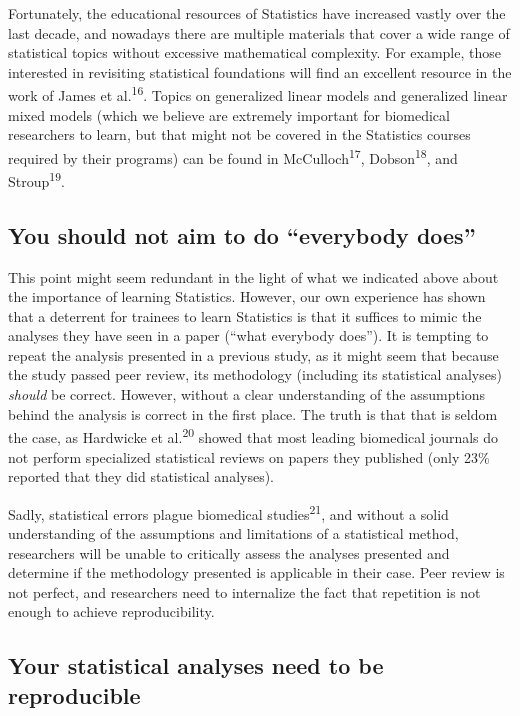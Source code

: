\documentclass[smallextended]{svjour3}       %
\begin{document}
Fortunately, the educational resources of Statistics have increased
vastly over the last decade, and nowadays there are multiple materials
that cover a wide range of statistical topics without excessive
mathematical complexity. For example, those interested in revisiting
statistical foundations will find an excellent resource in the work of
James et al.\textsuperscript{16}. Topics on generalized linear models
and generalized linear mixed models (which we believe are extremely
important for biomedical researchers to learn, but that might not be
covered in the Statistics courses required by their programs) can be
found in McCulloch\textsuperscript{17}, Dobson\textsuperscript{18}, and
Stroup\textsuperscript{19}.

\hypertarget{you-should-not-aim-to-do-everybody-does}{%
\subsection{You should not aim to do ``everybody
does''}\label{you-should-not-aim-to-do-everybody-does}}

This point might seem redundant in the light of what we indicated above
about the importance of learning Statistics. However, our own experience
has shown that a deterrent for trainees to learn Statistics is that it
suffices to mimic the analyses they have seen in a paper (``what
everybody does''). It is tempting to repeat the analysis presented in a
previous study, as it might seem that because the study passed peer
review, its methodology (including its statistical analyses)
\emph{should} be correct. However, without a clear understanding of the
assumptions behind the analysis is correct in the first place. The truth
is that that is seldom the case, as Hardwicke et al.\textsuperscript{20}
showed that most leading biomedical journals do not perform specialized
statistical reviews on papers they published (only 23\% reported that
they did statistical analyses).

Sadly, statistical errors plague biomedical studies\textsuperscript{21},
and without a solid understanding of the assumptions and limitations of
a statistical method, researchers will be unable to critically assess
the analyses presented and determine if the methodology presented is
applicable in their case. Peer review is not perfect, and researchers
need to internalize the fact that repetition is not enough to achieve
reproducibility.

\hypertarget{your-statistical-analyses-need-to-be-reproducible}{%
\subsection{Your statistical analyses need to be
reproducible}\label{your-statistical-analyses-need-to-be-reproducible}}
\end{document}
